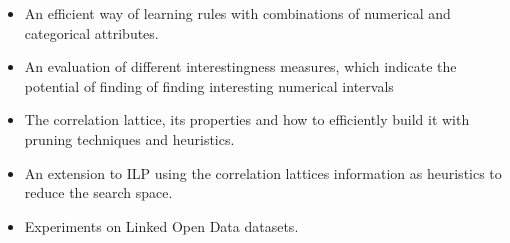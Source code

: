 \begin{itemize}

 \item An efficient way of learning rules with combinations of numerical and categorical attributes.
 \item An evaluation of different interestingness measures, which indicate the potential of finding of finding
interesting numerical intervals
 \item The correlation lattice, its properties and how to efficiently build it with pruning techniques and heuristics.
 \item An extension to ILP using the correlation lattices information as heuristics to reduce the search space.
 \item Experiments on Linked Open Data datasets.
\end{itemize}




\begin{comment}
 The remainder of this thesis is structured as follows. In
Chapter~\ref{ch:technical_background}, we provide technical background on
MapReduce and BigTable. In Chapter~\ref{ch:related_work}, we present a
summary of previous work in the areas of duplicate and near-duplicate detection,
information retrieval on web archives, and MapReduce applications in graph
processing. Following that, we state our problem and describe solutions in
Chapter~\ref{ch:redundancy_control}. In Chapter~\ref{ch:mapreduce_impl}, we
describe an implementation of our solution using the MapReduce framework. In
Chapter~\ref{ch:experiments}, we present our experimental results. We conclude
this thesis and outline directions of future research in Chapter~\ref{ch:future_work}.
\end{comment}
